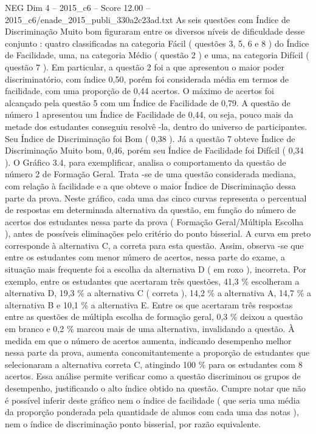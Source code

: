 \begin{textsample}{NEG Dim 4 – 2015\_c6 – Score 12.00 – 2015\_c6/enade\_2015\_publi\_330a2c23ad.txt}
As seis questões com Índice de Discriminação Muito bom figuraram entre os diversos níveis de dificuldade desse conjunto : quatro classificadas na categoria Fácil ( questões 3, 5, 6 e 8 ) do Índice de Facilidade, uma, na categoria Médio ( questão 2 ) e uma, na categoria Difícil ( questão 7 ).
Em particular, a questão 2 foi a que apresentou o maior poder discriminatório, com índice 0,50, porém foi considerada média em termos de facilidade, com uma proporção de 0,44 acertos.
O máximo de acertos foi alcançado pela questão 5 com um Índice de Facilidade de 0,79.
A questão de número 1 apresentou um Índice de Facilidade de 0,44, ou seja, pouco mais da metade dos estudantes conseguiu resolvê -la, dentro do universo de participantes.
Seu Índice de Discriminação foi Bom ( 0,38 ).
Já a questão 7 obteve Índice de Discriminação Muito bom, 0,46, porém seu Índice de Facilidade foi Difícil ( 0,34 ).
O Gráfico 3.4, para exemplificar, analisa o comportamento da questão de número 2 de Formação Geral.
Trata -se de uma questão considerada mediana, com relação à facilidade e a que obteve o maior Índice de Discriminação dessa parte da prova.
Neste gráfico, cada uma das cinco curvas representa o percentual de respostas em determinada alternativa da questão, em função do número de acertos dos estudantes nessa parte da prova ( Formação Geral/Múltipla Escolha ), antes de possíveis eliminações pelo critério do ponto bisserial.
A curva em preto corresponde à alternativa C, a correta para esta questão.
Assim, observa -se que entre os estudantes com menor número de acertos, nessa parte do exame, a situação mais frequente foi a escolha da alternativa D ( em roxo ), incorreta.
Por exemplo, entre os estudantes que acertaram três questões, 41,3 \% escolheram a alternativa D, 19,3 \% a alternativa C ( correta ), 14,2 \% a alternativa A, 14,7 \% a alternativa B e 10,1 \% a alternativa E.
Entre os que acertaram três respostas entre as questões de múltipla escolha de formação geral, 0,3 \% deixou a questão em branco e 0,2 \% marcou mais de uma alternativa, invalidando a questão.
À medida em que o número de acertos aumenta, indicando desempenho melhor nessa parte da prova, aumenta concomitantemente a proporção de estudantes que selecionaram a alternativa correta C, atingindo 100 \% para os estudantes com 8 acertos.
Essa análise permite verificar como a questão discriminou os grupos de desempenho, justificando o alto índice obtido na questão.
Cumpre notar que não é possível inferir deste gráfico nem o índice de facilidade ( que seria uma média da proporção ponderada pela quantidade de alunos com cada uma das notas ), nem o índice de discriminação ponto bisserial, por razão equivalente.

\end{textsample}
